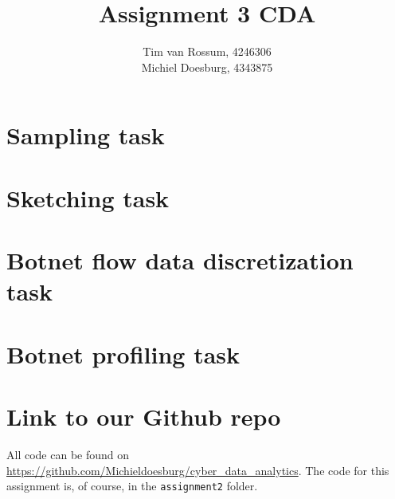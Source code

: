 \documentclass[]{article}
\title{Assignment 3 CDA}
\author{Tim van Rossum, 4246306\\
	Michiel Doesburg, 4343875}
\begin{document}
\maketitle

\section{Sampling task}
\section{Sketching task}
\section{Botnet flow data discretization task}
\section{Botnet profiling task}

\section{Link to our Github repo}
All code can be found on \url{https://github.com/Michieldoesburg/cyber_data_analytics}. The code for this assignment is, of course, in the \texttt{assignment2} folder.


\end{document}

